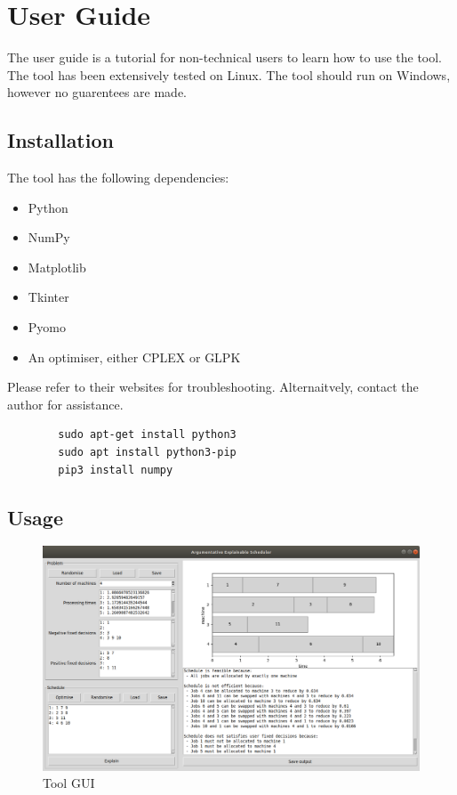 \chapter{User Guide}

The user guide is a tutorial for non-technical users to learn how to use the tool. The tool has been extensively tested on Linux. The tool should run on Windows, however no guarentees are made.

\section{Installation}

The tool has the following dependencies:

\begin{itemize}
	\item Python
	\item NumPy
	\item Matplotlib
	\item Tkinter
	\item Pyomo
	\item An optimiser, either CPLEX or GLPK
\end{itemize}

Please refer to their websites for troubleshooting. Alternaitvely, contact the author for assistance.

	\begin{verbatim}
		sudo apt-get install python3
		sudo apt install python3-pip
		pip3 install numpy
	\end{verbatim}

\section{Usage}

\begin{figure}[H]
	\centering
	\includegraphics[width=\linewidth]{figures/tool_gui.png}
	\caption{Tool GUI}
\end{figure}



